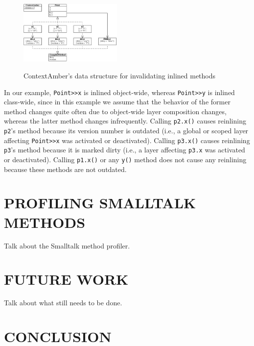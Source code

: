 \documentclass[english,paper=a4,twocolumn=true,DIV=calc,fontsize=9pt]{scrartcl}
\begin{document}
\begin{figure}[!htp]
    \centering
    \includegraphics[width=0.45\textwidth]{inlining_example.pdf}
    \label{fig:inlining-example}
    \caption{ContextAmber's data structure for invalidating inlined methods}
\end{figure}

In our example, \texttt{Point>>x} is inlined object-wide, whereas \texttt{Point>>y} is inlined class-wide, since in this example we assume that the behavior of the former method changes quite often due to object-wide layer composition changes, whereas the latter method changes infrequently. Calling \texttt{p2.x()} causes reinlining \texttt{p2}'s method because its version number is outdated (i.e., a global or scoped layer affecting \texttt{Point>>x} was activated or deactivated). Calling \texttt{p3.x()} causes reinlining \texttt{p3}'s method because it is marked dirty (i.e., a layer affecting \texttt{p3.x} was activated or deactivated). Calling \texttt{p1.x()} or any \texttt{y()} method does not cause any reinlining because these methods are not outdated.
\section{PROFILING SMALLTALK METHODS}
Talk about the Smalltalk method profiler.

\section{FUTURE WORK}
Talk about what still needs to be done.

\section{CONCLUSION}

{}

\end{document}
